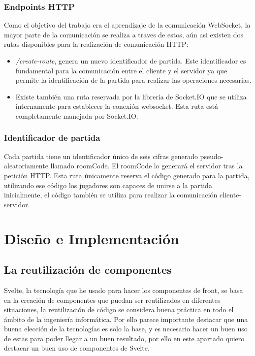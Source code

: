\subsubsection{Endpoints HTTP}
Como el objetivo del trabajo era el aprendizaje de la comunicación WebSocket, la mayor parte de la comunicación se realiza a traves de estos, aún asi existen dos rutas disponibles para la realización de comunicación HTTP:

\begin{itemize}
	\item \textit{/create-route}, genera un nuevo identificador de partida. Este identificador es fundamental para la comunicación entre el cliente y el servidor ya que permite la identificación de la partida para realizar las operaciones necesarias.
	\item Existe también una ruta reservada por la librería de Socket.IO que se utiliza internamente para establecer la conexión websocket. Esta ruta está completamente manejada por Socket.IO.
\end{itemize}

\subsubsection{Identificador de partida}
Cada partida tiene un identificador único de seis cifras generado pseudo-aleatoriamente llamado roomCode. El roomCode lo generará el servidor tras la petición HTTP. Esta ruta únicamente reserva el código generado para la partida, utilizando ese código los jugadores son capaces de unirse a la partida inicialmente, el código también se utiliza para realizar la comunicación cliente-servidor.


\section{Diseño e Implementación}

\subsection{La reutilización de componentes}
Svelte, la tecnología que he usado para hacer los componentes de front, se basa en la creación de componentes que puedan ser reutilizados en diferentes situaciones, la reutilización de código se considera buena práctica en todo el ámbito de la ingeniería informática. Por ello parece importante destacar que una buena elección de la tecnologías es solo la base, y es necesario hacer un buen uso de estas para poder llegar a un buen resultado, por ello en este apartado quiero destacar un buen uso de componentes de Svelte.

